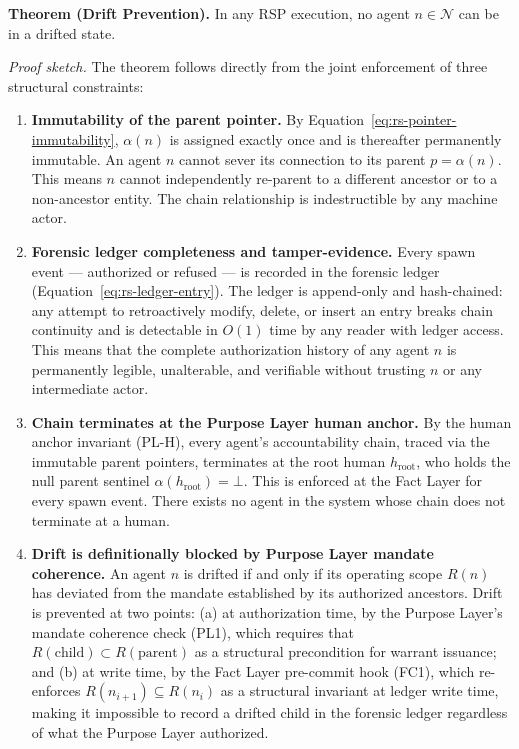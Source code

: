 \textbf{Theorem (Drift Prevention).} In any RSP execution, no agent $n \in \mathcal{N}$ can be in a drifted state.

\medskip
\noindent\textit{Proof sketch.} The theorem follows directly from the joint enforcement of three structural constraints:

\begin{enumerate}
    \item[(i)]\textbf{Immutability of the parent pointer.} By Equation~\ref{eq:rs-pointer-immutability}, $\alpha(n)$ is assigned exactly once and is thereafter permanently immutable. An agent $n$ cannot sever its connection to its parent $p = \alpha(n)$. This means $n$ cannot independently re-parent to a different ancestor or to a non-ancestor entity. The chain relationship is indestructible by any machine actor.

    \item[(ii)]\textbf{Forensic ledger completeness and tamper-evidence.} Every spawn event — authorized or refused — is recorded in the forensic ledger (Equation~\ref{eq:rs-ledger-entry}). The ledger is append-only and hash-chained: any attempt to retroactively modify, delete, or insert an entry breaks chain continuity and is detectable in $O(1)$ time by any reader with ledger access. This means that the complete authorization history of any agent $n$ is permanently legible, unalterable, and verifiable without trusting $n$ or any intermediate actor.

    \item[(iii)]\textbf{Chain terminates at the Purpose Layer human anchor.} By the human anchor invariant (PL-H), every agent's accountability chain, traced via the immutable parent pointers, terminates at the root human $h_{\text{root}}$, who holds the null parent sentinel $\alpha(h_{\text{root}}) = \bot$. This is enforced at the Fact Layer for every spawn event. There exists no agent in the system whose chain does not terminate at a human.

    \item[(iv)]\textbf{Drift is definitionally blocked by Purpose Layer mandate coherence.} An agent $n$ is drifted if and only if its operating scope $R(n)$ has deviated from the mandate established by its authorized ancestors. Drift is prevented at two points: (a) at authorization time, by the Purpose Layer's mandate coherence check (PL1), which requires that $R(\text{child}) \subset R(\text{parent})$ as a structural precondition for warrant issuance; and (b) at write time, by the Fact Layer pre-commit hook (FC1), which re-enforces $R(n_{i+1}) \subseteq R(n_i)$ as a structural invariant at ledger write time, making it impossible to record a drifted child in the forensic ledger regardless of what the Purpose Layer authorized.
\end{enumerate}

